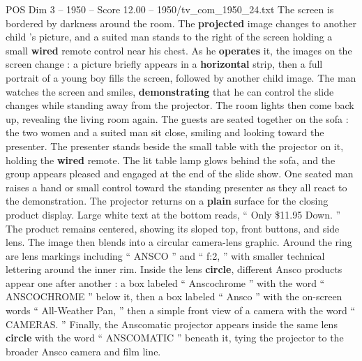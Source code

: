\begin{textsample}{POS Dim 3 – 1950 – Score 12.00 – 1950/tv\_com\_1950\_24.txt}
The screen is bordered by darkness around the room.
The \textbf{projected} image changes to another child ’s picture, and a suited man stands to the right of the screen holding a small \textbf{wired} remote control near his chest.
As he \textbf{operates} it, the images on the screen change : a picture briefly appears in a \textbf{horizontal} strip, then a full portrait of a young boy fills the screen, followed by another child image.
The man watches the screen and smiles, \textbf{demonstrating} that he can control the slide changes while standing away from the projector.
The room lights then come back up, revealing the living room again.
The guests are seated together on the sofa : the two women and a suited man sit close, smiling and looking toward the presenter.
The presenter stands beside the small table with the projector on it, holding the \textbf{wired} remote.
The lit table lamp glows behind the sofa, and the group appears pleased and engaged at the end of the slide show.
One seated man raises a hand or small control toward the standing presenter as they all react to the demonstration.
The projector returns on a \textbf{plain} surface for the closing product display.
Large white text at the bottom reads, “ Only \$11.95 Down. ” The product remains centered, showing its sloped top, front buttons, and side lens.
The image then blends into a circular camera-lens graphic.
Around the ring are lens markings including “ ANSCO ” and “ f:2, ” with smaller technical lettering around the inner rim.
Inside the lens \textbf{circle}, different Ansco products appear one after another : a box labeled “ Anscochrome ” with the word “ ANSCOCHROME ” below it, then a box labeled “ Ansco ” with the on-screen words “ All-Weather Pan, ” then a simple front view of a camera with the word “ CAMERAS. ” Finally, the Anscomatic projector appears inside the same lens \textbf{circle} with the word “ ANSCOMATIC ” beneath it, tying the projector to the broader Ansco camera and film line.

\end{textsample}

